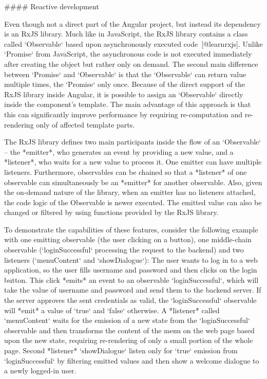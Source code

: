 \documentclass[
  digital, %
  oneside, %
  lof,     %
  nolot,     %
]{fithesis4}
\begin{document}
#### Reactive development

Even though not a direct part of the Angular project, but instead its dependency is an RxJS library. Much like  in JavaScript, the RxJS library contains a class called `Observable` based upon asynchronously executed code~[@learnrxjs]. Unlike `Promise` from JavaScript, the asynchronous code is not executed immediately after creating the object but rather only on demand. The second main difference between `Promise` and `Observable` is that the `Observable` can return value multiple times, the `Promise` only once. Because of the direct support of the RxJS library inside Angular, it is possible to assign an `Observable` directly inside the component's template. The main advantage of this approach is that this can significantly improve performance by requiring re-computation and re-rendering only of affected template parts.

The RxJS library defines two main participants inside the flow of an `Observable` -- the *emitter*, who generates an event by providing a new value, and a *listener*, who waits for a new value to process it. One emitter can have multiple listeners. Furthermore, observables can be chained so that a *listener* of one observable can simultaneously be an *emitter* for another observable. Also, given the on-demand nature of the library, when an emitter has no listeners attached, the code logic of the Observable is newer executed. The emitted value can also be changed or filtered by using functions provided by the RxJS library.

To demonstrate the capabilities of these features, consider the following example with one emitting observable (the user clicking on a button), one middle-chain observable (`loginSuccessful` processing the request to the backend) and two listeners (`menuContent` and `showDialogue`): The user wants to log in to a web application, so the user fills username and password and then clicks on the login button. This click *emits* an event to an observable `loginSuccessful`, which will take the value of username and password and send them to the backend server. If the server approves the sent credentials as valid, the `loginSuccessful` observable will *emit* a value of `true` and `false` otherwise. A *listener* called `menuContent` waits for the emission of a new state from the `loginSuccessful` observable and then transforms the content of the menu on the web page based upon the new state, requiring re-rendering of only a small portion of the whole page. Second *listener* `showDialogue` listen only for `true` emission from `loginSuccessful` by filtering emitted values and then show a welcome dialogue to a newly logged-in user.
\end{document}
